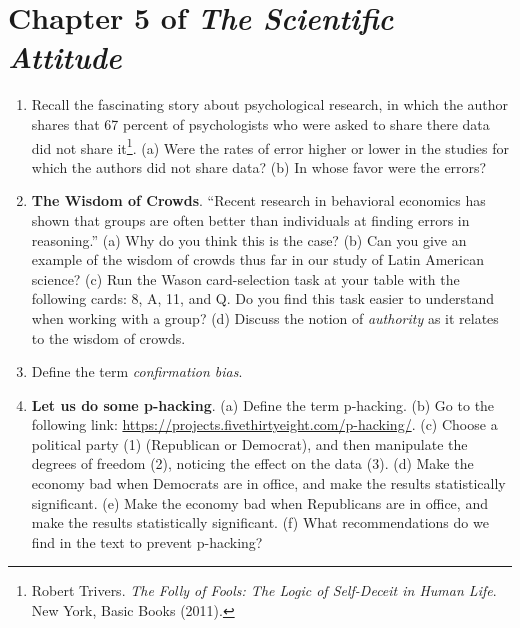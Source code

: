 \documentclass[12pt]{article}
\begin{document}
\maketitle

\small

\section{Chapter 5 of \textit{The Scientific Attitude}}

\begin{enumerate}
\item Recall the fascinating story about psychological research, in which the author shares that 67 percent of psychologists who were asked to share there data did not share it\footnote{Robert Trivers.  \textit{The Folly of Fools: The Logic of Self-Deceit in Human Life}.  New York, Basic Books (2011).}.  (a) Were the rates of error higher or lower in the studies for which the authors did not share data? (b) In whose favor were the errors? \\ \vspace{1cm}
\item \textbf{The Wisdom of Crowds}.  ``Recent research in behavioral economics has shown that groups are often better than individuals at finding errors in reasoning.''  (a) Why do you think this is the case? (b) Can you give an example of the wisdom of crowds thus far in our study of Latin American science? (c) Run the Wason card-selection task at your table with the following cards: 8, A, 11, and Q. Do you find this task easier to understand when working with a group? (d) Discuss the notion of \textit{authority} as it relates to the wisdom of crowds. \\ \vspace{1.25cm}
\item Define the term \textit{confirmation bias}. \\ \vspace{1cm}
\item \textbf{Let us do some p-hacking}.  (a) Define the term p-hacking. (b) Go to the following link: \url{https://projects.fivethirtyeight.com/p-hacking/}. (c) Choose a political party (1) (Republican or Democrat), and then manipulate the degrees of freedom (2), noticing the effect on the data (3).  (d) Make the economy bad when Democrats are in office, and make the results statistically significant.  (e) Make the economy bad when Republicans are in office, and make the results statistically significant. (f) What recommendations do we find in the text to prevent p-hacking? \\ \vspace{1.25cm}
\end{enumerate}
\end{document}
